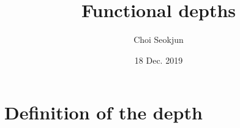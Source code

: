 \documentclass[aspectratio=169,ignorenonframetext,9pt]{beamer}
\title{Functional depths}
\author{Choi Seokjun}
\date{18 Dec. 2019}
\theoremstyle{plain}
\theoremstyle{definition}
\begin{document}
\begin{frame}
\maketitle
\end{frame}




\tableofcontents



\section{Definition of the depth}
\end{document}
